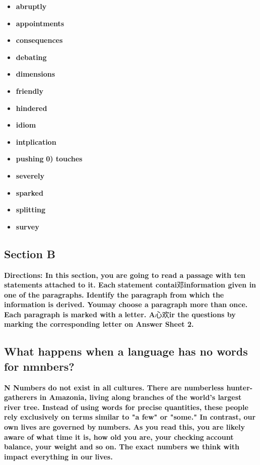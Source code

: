 \documentclass[UTF8,11pt]{ctexart}
\begin{document}
\begin{itemize}[leftmargin=2em,itemsep=.2em,topsep=.4em]\item[A.] \textbf{abruptly}
\item[B.] \textbf{appointments}
\item[C.] \textbf{consequences}
\item[D.] \textbf{debating}
\item[E.] \textbf{dimensions}
\item[F.] \textbf{friendly}
\item[G.] \textbf{hindered}
\item[H.] \textbf{idiom}
\item[I.] \textbf{intplication}
\item[J.] \textbf{pushing} \textbf{0) touches}
\item[K.] \textbf{severely}
\item[L.] \textbf{sparked}
\item[M.] \textbf{splitting}
\item[N.] \textbf{survey}
\end{itemize}

\subsection*{Section B}


\textbf{Directions: In this section, you are going to read a passage with ten statements attached to it. Each} \textbf{statement contai}邓\textbf{information given in one of the paragraphs. Identify the paragraph from which the} \textbf{information is derived. You\textperiodcentered{}may choose a paragraph more than once. Each paragraph is marked with a} \textbf{letter. A}心欢\textbf{ir the questions by marking the corresponding letter on Answer Sheet 2.}


\subsection*{\textbf{What happens when a language has no words for nmnbers?}}


\textbf{N Numbers do not exist in all cultures. There are numberless hunter-gatherers in Amazonia, living along} \textbf{branches of the world's largest river tree. Instead of using words for precise quantities, these people} \textbf{rely exclusively on terms similar to "a few" or "some." In contrast, our own lives are governed by} \textbf{numbers. As you read this, you are likely aware of what time it is, how old you are, your checking} \textbf{account balance, your weight and so on. The exact numbers we think with impact everything in our} \textbf{lives.}
\end{document}
